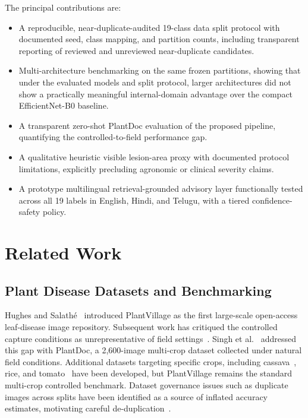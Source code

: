 \documentclass[conference]{IEEEtran}
\begin{document}
The principal contributions are:
\begin{itemize}
    \item A reproducible, near-duplicate-audited 19-class data split
          protocol with documented seed, class mapping, and partition
          counts, including transparent reporting of reviewed and
          unreviewed near-duplicate candidates.
    \item Multi-architecture benchmarking on the same frozen
          partitions, showing that under the evaluated models and
          split protocol, larger architectures did not show a
          practically meaningful internal-domain advantage over the
          compact EfficientNet-B0 baseline.
    \item A transparent zero-shot PlantDoc evaluation of the proposed
          pipeline, quantifying the controlled-to-field performance
          gap.
    \item A qualitative heuristic visible lesion-area proxy with
          documented protocol limitations, explicitly precluding
          agronomic or clinical severity claims.
    \item A prototype multilingual retrieval-grounded advisory layer
          functionally tested across all 19 labels in English, Hindi,
          and Telugu, with a tiered confidence-safety policy.
\end{itemize}

\section{Related Work}
\label{sec:related}

\subsection{Plant Disease Datasets and Benchmarking}

Hughes and Salath\'{e}~\cite{hughes2015open} introduced PlantVillage
as the first large-scale open-access leaf-disease image repository.
Subsequent work has critiqued the controlled capture conditions as
unrepresentative of field
settings~\cite{mohanty2016deep,barbedo2018factors}.
Singh et al.~\cite{singh2020plantdoc} addressed this gap with
PlantDoc, a 2{,}600-image multi-crop dataset collected under natural
field conditions. Additional datasets targeting specific crops,
including
cassava~\cite{mwebaze2019icassava,ramcharan2017deep},
rice, and
tomato~\cite{fuentes2017robust} have been developed, but PlantVillage
remains the standard multi-crop controlled benchmark. Dataset
governance issues such as duplicate images across splits have been
identified as a source of inflated accuracy estimates, motivating
careful
de-duplication~\cite{northcutt2021pervasive,barz2020we}.
\end{document}
